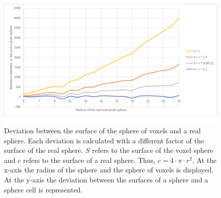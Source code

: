 \begin{figure}[ht]
	\center
	\includegraphics[scale=0.3]{figures/DeviationSphereToPixelSphere.png}
	\caption[Deviation between the surface of the sphere of voxels and a real sphere]{Deviation between the surface of the sphere of voxels and a real sphere. Each deviation is calculated with a different factor of the surface of the real sphere. $S$ refers to the surface of the voxel sphere and $c$ refers to the surface of a real sphere. Thus, $c = 4 \cdot \pi \cdot r^{2}$. \newline
	At the x-axis the radius of the sphere and the sphere of voxels is displayed. At the y-axis the deviation between the surfaces of a sphere and a sphere cell is represented.}
	\label{img:DeviationSphere}
\end{figure}

